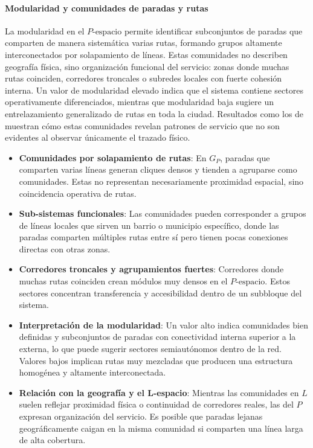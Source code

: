             \paragraph{Modularidad y comunidades de paradas y rutas}
            La modularidad en el $P\text{-espacio}$ permite identificar subconjuntos de paradas que comparten de manera sistemática varias rutas, formando grupos altamente interconectados por solapamiento de líneas. Estas comunidades no describen geografía física, sino organización funcional del servicio: zonas donde muchas rutas coinciden, corredores troncales o subredes locales con fuerte cohesión interna. Un valor de modularidad elevado indica que el sistema contiene sectores operativamente diferenciados, mientras que modularidad baja sugiere un entrelazamiento generalizado de rutas en toda la ciudad. Resultados como los de \cite{zhang2019} muestran cómo estas comunidades revelan patrones de servicio que no son evidentes al observar únicamente el trazado físico.

            \begin{itemize}
                \item \textbf{Comunidades por solapamiento de rutas}: En $G_P$, paradas que comparten varias líneas generan cliques densos y tienden a agruparse como comunidades. Estas no representan necesariamente proximidad espacial, sino coincidencia operativa de rutas.

                \item \textbf{Sub-sistemas funcionales}: Las comunidades pueden corresponder a grupos de líneas locales que sirven un barrio o municipio específico, donde las paradas comparten múltiples rutas entre sí pero tienen pocas conexiones directas con otras zonas.

                \item \textbf{Corredores troncales y agrupamientos fuertes}: Corredores donde muchas rutas coinciden crean módulos muy densos en el $P\text{-espacio}$. Estos sectores concentran transferencia y accesibilidad dentro de un subbloque del sistema.

                \item \textbf{Interpretación de la modularidad}: Un valor alto indica comunidades bien definidas y subconjuntos de paradas con conectividad interna superior a la externa, lo que puede sugerir sectores semiautónomos dentro de la red. Valores bajos implican rutas muy mezcladas que producen una estructura homogénea y altamente interconectada.

                \item \textbf{Relación con la geografía y el L-espacio}: Mientras las comunidades en $L$ suelen reflejar proximidad física o continuidad de corredores reales, las del $P$ expresan organización del servicio. Es posible que paradas lejanas geográficamente caigan en la misma comunidad si comparten una línea larga de alta cobertura.
            \end{itemize}

